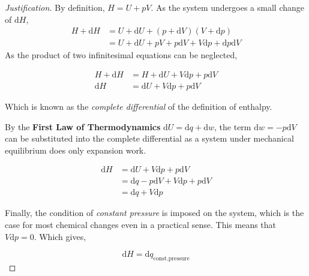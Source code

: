 \documentclass{article}
\numberwithin{theorem}{section}
\numberwithin{corollary}{section}
\numberwithin{postulate}{section}
\numberwithin{lemma}{section}
\numberwithin{definition}{section}
\newenvironment{justification} {\begin{proof}[Justification]} {\end{proof}}
\begin{document}
\begin{justification}
  By definition, $H = U + pV$. As the system undergoes a small change of $\mathrm{d}H$,
  \begin{equation*}
    \begin{split}
      H + \mathrm{d}H & = U + \mathrm{d}U + (p + \mathrm{d}V)(V + \mathrm{d}p) \\
      & = U + \mathrm{d}U + pV + p\mathrm{d}V + V\mathrm{d}p +
      \mathrm{d}p\mathrm{d}V
    \end{split}
  \end{equation*}
  As the product of two infinitesimal equations can be neglected,

  \begin{equation*}
    \begin{split}
      H + \mathrm{d}H & = H + \mathrm{d}U + V\mathrm{d}p + p\mathrm{d}V \\
      \mathrm{d}H & = \mathrm{d}U + V\mathrm{d}p + p\mathrm{d}V
    \end{split}
  \end{equation*}
  
  Which is known as the \textit{complete differential} of the definition of
  enthalpy.

  By the \textbf{First Law of Thermodynamics} $\mathrm{d}U = \mathrm{d}q +
  \mathrm{d}w$, the term $\mathrm{d}w = -p\mathrm{d}V$ can be substituted into
  the complete differential as a system under mechanical equilibrium does only
  expansion work.
  
  \begin{equation*}
    \begin{split}
      \mathrm{d}H & = \mathrm{d}U + V\mathrm{d}p + p\mathrm{d}V \\
      & = \mathrm{d}q - p\mathrm{d}V + V\mathrm{d}p + p\mathrm{d}V \\
      & = \mathrm{d}q + V\mathrm{d}p
    \end{split}
  \end{equation*}

Finally, the condition of \textit{constant pressure} is imposed on the system, which is the case for most chemical changes even in a practical sense. This means that $V\mathrm{d}p = 0$. Which gives,

\begin{equation}
  \mathrm{d}H = \mathrm{d}q_{\mathrm{const. pressure}}
\end{equation}

\end{justification}
\end{document}
